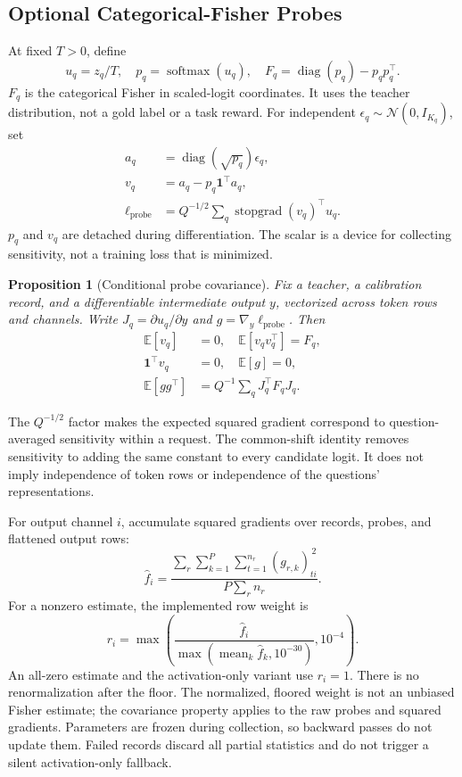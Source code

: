 \documentclass[10pt,twocolumn]{article}
\newcommand{\E}{\mathbb E}
\newcommand{\diag}{\operatorname{diag}}
\newcommand{\softmax}{\operatorname{softmax}}
\newcommand{\sg}{\operatorname{stopgrad}}
\newtheorem{proposition}{Proposition}
\begin{document}
\subsection{Optional Categorical-Fisher Probes}
At fixed $T>0$, define
\begin{equation}
 u_q=z_q/T,\quad p_q=\softmax(u_q),\quad
 F_q=\diag(p_q)-p_qp_q^\top .
 \label{eq:fisher}
\end{equation}
$F_q$ is the categorical Fisher in scaled-logit coordinates.
It uses the teacher distribution, not a gold label or a task reward.
For independent $\epsilon_q\sim\mathcal N(0,I_{K_q})$, set
\begin{align}
 a_q&=\diag(\sqrt{p_q})\epsilon_q,\\
 v_q&=a_q-p_q\mathbf 1^\top a_q,\\
 \ell_{\mathrm{probe}}&=Q^{-1/2}\sum_q \sg(v_q)^\top u_q .
 \label{eq:probe}
\end{align}
$p_q$ and $v_q$ are detached during differentiation.
The scalar is a device for collecting sensitivity, not a training loss
that is minimized.

\begin{proposition}[Conditional probe covariance]
Fix a teacher, a calibration record, and a differentiable intermediate
output $y$, vectorized across token rows and channels.
Write $J_q=\partial u_q/\partial y$ and
$g=\nabla_y\ell_{\mathrm{probe}}$. Then
\begin{align}
 \E[v_q]&=0,\quad \E[v_qv_q^\top]=F_q,\\
 \mathbf 1^\top v_q&=0,\quad \E[g]=0,\\
 \E[gg^\top]&=Q^{-1}\sum_q J_q^\top F_qJ_q .
 \label{eq:propagated}
\end{align}
\label{prop:cov}
\end{proposition}
The $Q^{-1/2}$ factor makes the expected squared gradient correspond
to question-averaged sensitivity within a request. The common-shift
identity removes sensitivity to adding the same constant to every
candidate logit. It does not imply independence of token rows or
independence of the questions' representations.

For output channel $i$, accumulate squared gradients over records,
probes, and flattened output rows:
\begin{equation}
 \widehat f_i=
 \frac{\sum_r\sum_{k=1}^P\sum_{t=1}^{n_r}
       (g_{r,k})_{ti}^{\,2}}
      {P\sum_r n_r}.
 \label{eq:moment}
\end{equation}
For a nonzero estimate, the implemented row weight is
\begin{equation}
 r_i=\max\left(
 \frac{\widehat f_i}{\max(\operatorname{mean}_k\widehat f_k,10^{-30})},
 10^{-4}\right).
 \label{eq:row}
\end{equation}
An all-zero estimate and the activation-only variant use $r_i=1$.
There is no renormalization after the floor.
The normalized, floored weight is not an unbiased Fisher estimate;
the covariance property applies to the raw probes and squared gradients.
Parameters are frozen during collection, so backward passes do not
update them. Failed records discard all partial statistics and do
not trigger a silent activation-only fallback.
\end{document}
